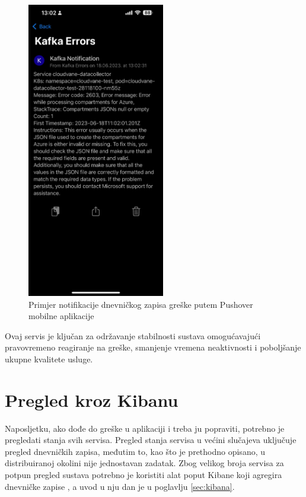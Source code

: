\documentclass[times, utf8, diplomski]{fer}
\begin{document}
\begin{figure}[htb]
	\centering
	\includegraphics[width=6cm]{images/mobile_notif.png}
	\caption[Primjer notifikacije dnevničkog zapisa greške putem Pushover mobilne aplikacije]{Primjer notifikacije dnevničkog zapisa greške putem Pushover mobilne aplikacije}
	\label{fig:notif_pushover}
\end{figure}

Ovaj servis je ključan za održavanje stabilnosti sustava omogućavajući pravovremeno reagiranje na greške, smanjenje vremena neaktivnosti i poboljšanje ukupne kvalitete usluge.

\clearpage
\section{Pregled kroz Kibanu}
\label{sec:kibanaImpl}

Naposljetku, ako dođe do greške u aplikaciji i treba ju popraviti, potrebno je pregledati stanja svih servisa. Pregled stanja servisa u većini slučajeva uključuje pregled dnevničkih zapisa, međutim to, kao što je prethodno opisano, u distribuiranoj okolini nije jednostavan zadatak. Zbog velikog broja servisa za potpun pregled sustava potrebno je koristiti alat poput Kibane koji agregira dnevničke zapise , a uvod u nju dan je u poglavlju \ref{sec:kibana}.\\
\end{document}
